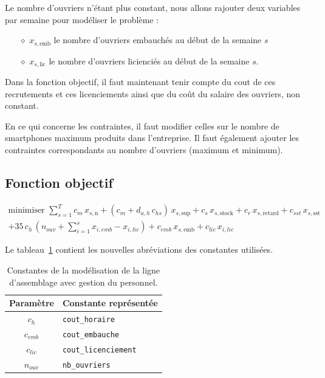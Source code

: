 \documentclass[12pt,oneside,a4paper]{article}
\newcommand{\myX}[2]{x_{#1,\text{#2}}}
\newcommand{\xSemaine}[1]{\myX{s}{#1}}
\newcommand{\xn}{\xSemaine{n}}
\newcommand{\xsup}{\xSemaine{sup}}
\newcommand{\xstock}{\xSemaine{stock}}
\newcommand{\xretard}{\xSemaine{retard}}
\newcommand{\xsst}{\xSemaine{sst}}
\newcommand{\xemb}{\xSemaine{emb}}
\newcommand{\xlic}{\xSemaine{lic}}
\begin{document}
Le nombre d'ouvriers n'étant plus constant, nous allons rajouter deux variables
par semaine pour modéliser le problème :
\begin{itemize}
  \item[$\diamond$] $\xemb$ le nombre d'ouvriers embauchés au début de la semaine $s$
  \item[$\diamond$] $\xlic$ le nombre d'ouvriers licienciés au début de la semaine $s$.
\end{itemize}
Dans la fonction objectif, il faut maintenant tenir compte du cout de 
ces recrutements et ces licenciements 
ainsi que du coût du salaire des ouvriers, non constant.

En ce qui concerne les contraintes, il faut modifier celles sur 
le nombre de smartphones maximum produits dans l'entreprise. 
Il faut également ajouter les contraintes correspondants 
au nombre d'ouvriers (maximum et minimum).

\subsection*{Fonction objectif}
\begin{align*}
  \mbox{minimiser } 
  \sum_{s=1}^{T} 
  c_m\, \xn + (c_m + d_{a,h} \, c_{hs})\, \xsup
  + c_s\, \xstock + c_r\, \xretard + c_{sst}\, \xsst \\
  + 35 \, c_{h} \, (n_{ouv} + \sum_{i=1}^{s} x_{i,emb} - x_{i,lic}) 
  + c_{emb} \, \xemb + c_{lic} \, x_{i,lic}
\end{align*}

Le tableau~\ref{tab:constantesQuestion7} contient les nouvelles abréviations
des constantes utilisées.
\begin{table}[h]
  \begin{center}
  \begin{tabular}{|c|l|}
    \hline
    Paramètre & Constante représentée \\
    \hline
    \hline
    $c_{h}$ & \texttt{cout\_horaire} \\
    \hline
    $c_{emb}$ & \texttt{cout\_embauche} \\
    \hline
    $c_{lic}$ & \texttt{cout\_licenciement} \\
    \hline
    $n_{ouv}$ & \texttt{nb\_ouvriers} \\
    \hline
  \end{tabular}
  \caption{Constantes de la modélisation de la ligne d'assemblage
  avec gestion du personnel.}
  \label{tab:constantesQuestion7}
  \end{center}
\end{table}
\end{document}
